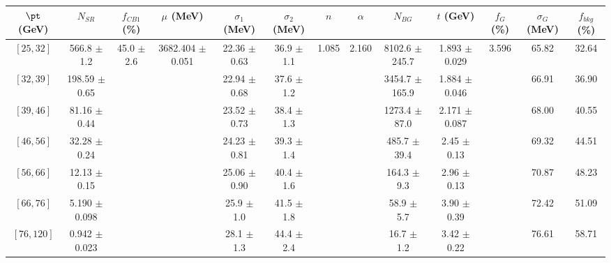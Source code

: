 \begin{tabular}{c||c|c|c|c|c|c|c|c|c|c|c||c}
$\pt$ (GeV) & $N_{SR}$ & $f_{CB1}$ (\%) & $\mu$ (MeV) & $\sigma_1$ (MeV) & $\sigma_2$ (MeV) & $n$ & $\alpha$ & $N_{BG}$ & $t$ (GeV) & $f_G$ (\%) & $\sigma_G$ (MeV) & $f_{bkg}$ (\%) \\
\hline
$[25, 32]$ & 566.8 $\pm$ 1.2 & \multirow{7}{*}{45.0 $\pm$ 2.6} & \multirow{7}{*}{3682.404 $\pm$ 0.051} & 22.36 $\pm$ 0.63 & 36.9 $\pm$ 1.1 & \multirow{7}{*}{1.085} & \multirow{7}{*}{2.160} & 8102.6 $\pm$ 245.7 & 1.893 $\pm$ 0.029 & \multirow{7}{*}{3.596} & 65.82 & 32.64\\
$[32, 39]$ & 198.59 $\pm$ 0.65 &  &  & 22.94 $\pm$ 0.68 & 37.6 $\pm$ 1.2 &  &  & 3454.7 $\pm$ 165.9 & 1.884 $\pm$ 0.046 &  & 66.91 & 36.90\\
$[39, 46]$ & 81.16 $\pm$ 0.44 &  &  & 23.52 $\pm$ 0.73 & 38.4 $\pm$ 1.3 &  &  & 1273.4 $\pm$ 87.0 & 2.171 $\pm$ 0.087 &  & 68.00 & 40.55\\
$[46, 56]$ & 32.28 $\pm$ 0.24 &  &  & 24.23 $\pm$ 0.81 & 39.3 $\pm$ 1.4 &  &  & 485.7 $\pm$ 39.4 & 2.45 $\pm$ 0.13 &  & 69.32 & 44.51\\
$[56, 66]$ & 12.13 $\pm$ 0.15 &  &  & 25.06 $\pm$ 0.90 & 40.4 $\pm$ 1.6 &  &  & 164.3 $\pm$ 9.3 & 2.96 $\pm$ 0.13 &  & 70.87 & 48.23\\
$[66, 76]$ & 5.190 $\pm$ 0.098 &  &  & 25.9 $\pm$ 1.0 & 41.5 $\pm$ 1.8 &  &  & 58.9 $\pm$ 5.7 & 3.90 $\pm$ 0.39 &  & 72.42 & 51.09\\
$[76, 120]$ & 0.942 $\pm$ 0.023 &  &  & 28.1 $\pm$ 1.3 & 44.4 $\pm$ 2.4 &  &  & 16.7 $\pm$ 1.2 & 3.42 $\pm$ 0.22 &  & 76.61 & 58.71\\
\end{tabular}
